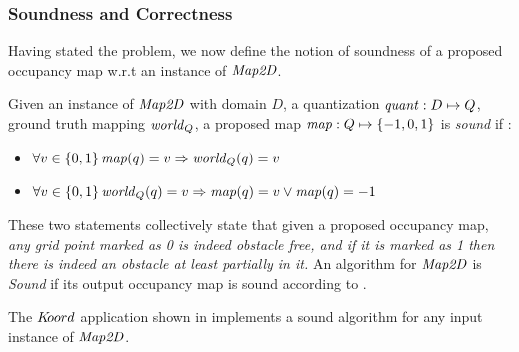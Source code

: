 \subsubsection{Soundness and Correctness}
Having stated the problem, we now define the notion of soundness of a proposed occupancy map w.r.t an instance of $\mathit{Map2D}$. 
\begin{definition}
\label{soundness}
Given an instance of $\mathit{Map2D}$ with domain $D$, a quantization $\mathit{quant}: D\mapsto Q$, ground truth mapping $\mathit{world}_Q$, a proposed map $\mathit{map}: Q \mapsto \left\{-1,0,1\right\}$ is \emph{sound} if :
\begin{itemize}
\item $\forall v \in \left\{0,1\right\} \mathit{map}(q) = v \Rightarrow \mathit{world}_Q(q)  = v$
\item $\forall v \in \left\{0,1\right\}\mathit{world}_Q(q) = v \Rightarrow \mathit{map}(q) = v \vee \mathit{map}(q) = -1$
\end{itemize}
\end{definition}

These two statements collectively state that given a proposed occupancy map, \emph{any grid point marked as 0 is indeed obstacle free, and if it is marked as 1 then there is indeed an obstacle at least partially in it.}  An algorithm for $\mathit{Map2D}$ is \emph{Sound} if its output occupancy map is sound according to .

\begin{theorem}
The $K\kern-2pt oord$ application shown in  implements a sound algorithm for any input instance of $\mathit{Map2D}$.
\end{theorem}